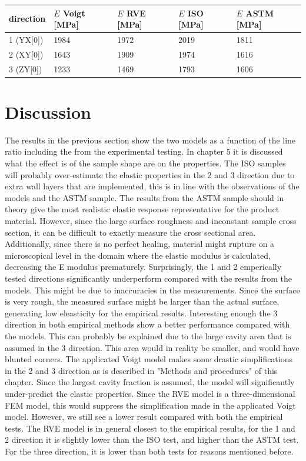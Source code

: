 \begin{tabular}{ |p{2.2cm}||p{2.2cm}|p{2.2cm}|p{2.2cm}|p{2.2cm}|}
 \hline
direction & $E$ Voigt [MPa] & $E$ RVE [MPa]& $E$ ISO [MPa]& $E$ ASTM [MPa] \\ 
\hline
1 (YX[0]) & 1984 & 1972 & 2019 & 1811 \\
2 (XY[0]) & 1643 & 1909 & 1974 & 1616 \\
3 (ZY[0]) & 1233 & 1469 & 1793 & 1606 \\
 \hline
\end{tabular}
     \label{tab:Elasticproperties}

\section{Discussion}
The results in the previous section show the two models as a function of the line ratio including the from the experimental testing. In chapter 5 it is discussed what the effect is of the sample shape are on the properties. The ISO samples will probably over-estimate the elastic properties in the 2 and 3 direction due to extra wall layers that are implemented, this is in line with the observations of the models and the ASTM sample. The results from the ASTM sample should in theory give the most realistic elastic response representative for the product material. However, since the large surface roughness and inconstant sample cross section, it can be difficult to exactly measure the cross sectional area. Additionally, since there is no perfect healing, material might rupture on a microscopical level in the domain where the elastic modulus is calculated, decreasing the E modulus prematurely.  Surprisingly, the 1 and 2 emperically tested directions significantly underperform compared with the results from the models. This might be due to inaccuracies in the measurements. Since the surface is very rough, the measured surface might be larger than the actual surface, generating low eleasticity for the empirical results. Interesting enough the 3 direction in both empirical methods show a better performance compared with the models. This can probably be explained due to the large cavity area that is assumed in the 3 direction. This area would in reality be smaller, and would have blunted corners. 
The applicated Voigt model makes some drastic simplifications in the 2 and 3 direction as is described in "Methods and procedures" of this chapter. Since the largest cavity fraction is assumed, the model will significantly under-predict the elastic properties. Since the RVE model is a three-dimensional FEM model, this would suppress the simplification made in the applicated Voigt model. However, we still see a lower result compared with both the empirical tests. The RVE model is in general closest to the empirical results, for the 1 and 2 direction it is slightly lower than the ISO test, and higher than the ASTM test. For the three direction, it is lower than both tests for reasons mentioned before.

